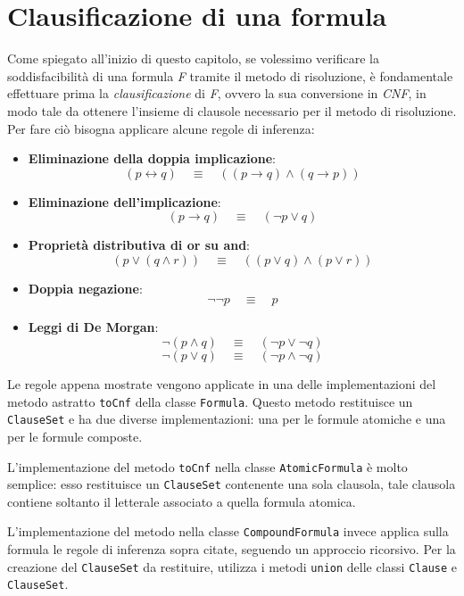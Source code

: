 \documentclass[a4paper,12pt]{report}
\newcommand{\tto} {\leftrightarrow}
\begin{document}
\section{Clausificazione di una formula}
\label{clausification}
Come spiegato all'inizio di questo capitolo, se volessimo verificare la soddisfacibilità di una formula \emph{F} tramite il metodo di risoluzione, è fondamentale effettuare prima la \emph{clausificazione} di \emph{F}, ovvero la sua conversione in \emph{CNF}, in modo tale da ottenere l'insieme di clausole necessario per il metodo di risoluzione. Per fare ciò bisogna applicare alcune regole di inferenza:
\begin{itemize}
    \item \textbf{Eliminazione della doppia implicazione}: 
    \[
    (p \tto q) \quad \equiv \quad ((p \to q) \land (q \to p))
    \]
    
    \item \textbf{Eliminazione dell'implicazione}: 
    \[
    (p \to q) \quad \equiv \quad (\lnot p \lor q)
    \]
    
    \item \textbf{Proprietà distributiva di or su and}:
    \[
    (p \lor (q \land r)) \quad \equiv \quad ((p \lor q) \land (p \lor r))
    \]
    
    \item \textbf{Doppia negazione}:
    \[
    \lnot\lnot p \quad \equiv \quad p
    \]
    
    \item \textbf{Leggi di De Morgan}:
    \[
    \lnot(p \land q) \quad \equiv \quad (\lnot p \lor \lnot q)
    \]
    \[
    \lnot(p \lor q) \quad \equiv \quad (\lnot p \land \lnot q)
    \]
\end{itemize}
Le regole appena mostrate vengono applicate in una delle implementazioni del metodo astratto \texttt{toCnf} della classe \texttt{Formula}. Questo metodo restituisce un \texttt{ClauseSet} e ha due diverse implementazioni: una per le formule atomiche e una per le formule composte.

L'implementazione del metodo \texttt{toCnf} nella classe \texttt{AtomicFormula} è molto semplice: esso restituisce un \texttt{ClauseSet} contenente una sola clausola, tale clausola contiene soltanto il letterale associato a quella formula atomica.
 
L'implementazione del metodo nella classe \texttt{CompoundFormula} invece applica sulla formula le regole di inferenza sopra citate, seguendo un approccio ricorsivo. Per la creazione del \texttt{ClauseSet} da restituire, utilizza i metodi \texttt{union} delle classi \texttt{Clause} e \texttt{ClauseSet}.
\end{document}
